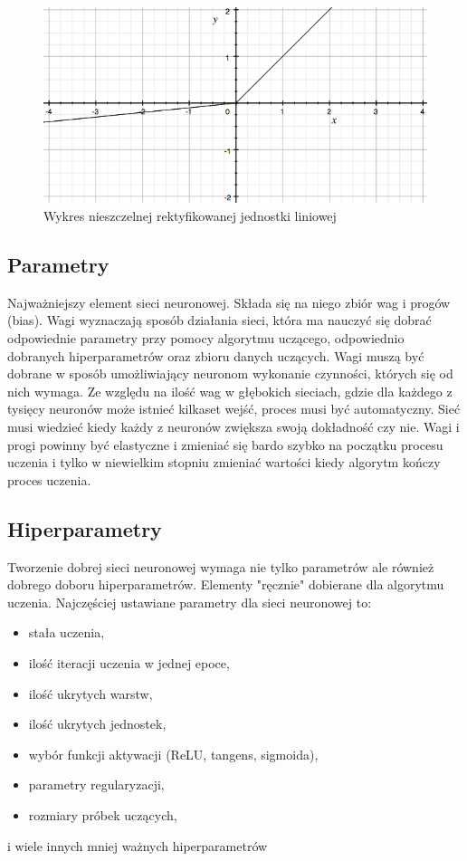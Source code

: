 \documentclass[12pt,a4paper,twoside,titlepage,openright]{book}
\begin{document}
\begin{figure}[h]
	\centering
			\includegraphics[resolution=100, scale=0.8]{leakyReLU.png}
		\caption{Wykres nieszczelnej rektyfikowanej jednostki liniowej}
\end{figure}

\subsection{Parametry}
Najważniejszy element sieci neuronowej. Składa się na niego zbiór wag i progów (bias). Wagi wyznaczają sposób działania sieci, która ma nauczyć się dobrać odpowiednie parametry przy pomocy algorytmu uczącego, odpowiednio dobranych hiperparametrów oraz zbioru danych uczących. Wagi muszą być dobrane w sposób umożliwiający neuronom wykonanie czynności, których się od nich wymaga. Ze względu na ilość wag w głębokich sieciach, gdzie dla każdego z tysięcy neuronów może istnieć kilkaset wejść, proces musi być automatyczny. Sieć musi wiedzieć kiedy każdy z neuronów zwiększa swoją dokładność czy nie. Wagi i progi powinny być elastyczne i zmieniać się bardo szybko na początku procesu uczenia i tylko w niewielkim stopniu zmieniać wartości kiedy algorytm kończy proces uczenia.

\subsection{Hiperparametry}
Tworzenie dobrej sieci neuronowej wymaga nie tylko parametrów ale również dobrego doboru hiperparametrów. Elementy "ręcznie" dobierane dla algorytmu uczenia. Najczęściej ustawiane parametry dla sieci neuronowej to:
\begin{itemize}
\item stała uczenia,
\item ilość iteracji uczenia w jednej epoce,
\item ilość ukrytych warstw,
\item ilość ukrytych jednostek,
\item wybór funkcji aktywacji (ReLU, tangens, sigmoida),
\item parametry regularyzacji,
\item rozmiary próbek uczących,
\end{itemize}
i wiele innych mniej ważnych hiperparametrów
\end{document}
